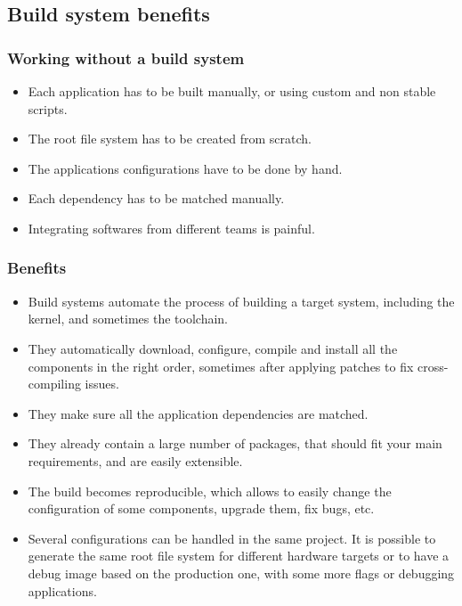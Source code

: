 \subsection{Build system benefits}

\begin{frame}
  \frametitle{Working without a build system}
  \begin{itemize}
    \item Each application has to be built manually, or using custom
          and non stable scripts.
    \item The root file system has to be created from scratch.
    \item The applications configurations have to be done by hand.
    \item Each dependency has to be matched manually.
    \item Integrating softwares from different teams is painful.
  \end{itemize}
\end{frame}

\begin{frame}
  \frametitle{Benefits}
  \begin{itemize}
    \item Build systems automate the process of building a target
      system, including the kernel, and sometimes the toolchain.
    \item They automatically download, configure, compile and install
      all the components in the right order, sometimes after applying
      patches to fix cross-compiling issues.
    \item They make sure all the application dependencies are matched.
    \item They already contain a large number of packages, that should
      fit your main requirements, and are easily extensible.
    \item The build becomes reproducible, which allows to easily
      change the configuration of some components, upgrade them, fix
      bugs, etc.
    \item Several configurations can be handled in the same project.
      It is possible to generate the same root file system for
      different hardware targets or to have a debug image based on the
      production one, with some more flags or debugging applications.
  \end{itemize}
\end{frame}

